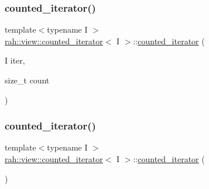 \mbox{\label{structrah_1_1view_1_1counted__iterator_aa26e9c047e175303c296758316634890}} 
\subsubsection{\texorpdfstring{counted\_iterator()}{counted\_iterator()}\hspace{0.1cm}{\footnotesize\ttfamily [2/4]}}
{\footnotesize\ttfamily template$<$typename I $>$ \\
\mbox{\hyperlink{structrah_1_1view_1_1counted__iterator}{rah\+::view\+::counted\+\_\+iterator}}$<$ I $>$\+::\mbox{\hyperlink{structrah_1_1view_1_1counted__iterator}{counted\+\_\+iterator}} (\begin{DoxyParamCaption}\item[{I}]{iter,  }\item[{size\+\_\+t}]{count }\end{DoxyParamCaption})\hspace{0.3cm}{\ttfamily [inline]}}

\mbox{\label{structrah_1_1view_1_1counted__iterator_a73f275166ac5f41bd93d96ccab15eab0}} 
\subsubsection{\texorpdfstring{counted\_iterator()}{counted\_iterator()}\hspace{0.1cm}{\footnotesize\ttfamily [3/4]}}
{\footnotesize\ttfamily template$<$typename I $>$ \\
\mbox{\hyperlink{structrah_1_1view_1_1counted__iterator}{rah\+::view\+::counted\+\_\+iterator}}$<$ I $>$\+::\mbox{\hyperlink{structrah_1_1view_1_1counted__iterator}{counted\+\_\+iterator}} (\begin{DoxyParamCaption}{ }\end{DoxyParamCaption})\hspace{0.3cm}{\ttfamily [default]}}

